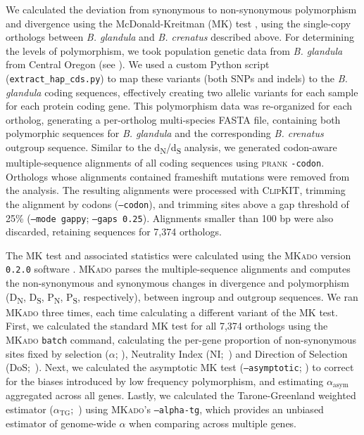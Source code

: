 \documentclass[11pt]{article}
\newcommand{\dnds}{d\textsubscript{N}/d\textsubscript{S}\xspace}
\newcommand{\bgla}{\textit{B. glandula}\xspace}
\begin{document}
We calculated the deviation from synonymous to non-synonymous polymorphism and
divergence using the McDonald-Kreitman (MK) test \citep{mcdonald_adaptive_1991},
using the single-copy orthologs between \bgla{} and \textit{B. crenatus} described
above.
For determining the levels of polymorphism, we took population genetic data from
\bgla{} from Central Oregon (see ).
We used a custom Python script (\texttt{extract\_hap\_cds.py}) to map these
variants (both SNPs and indels) to the \bgla{} coding sequences, effectively
creating two allelic variants for each sample for each protein coding gene.
This polymorphism data was re-organized for each ortholog, generating a
per-ortholog multi-species FASTA file, containing both polymorphic sequences for
\bgla{} and the corresponding \textit{B. crenatus} outgroup sequence.
Similar to the \dnds{} analysis, we generated codon-aware multiple-sequence
alignments of all coding sequences using \textsc{prank} \texttt{-codon}.
Orthologs whose alignments contained frameshift mutations were removed from the
analysis.
The resulting alignments were processed with \textsc{ClipKIT}, trimming the
alignment by codons (\texttt{--codon}), and trimming sites above a gap threshold
of 25\% (\texttt{--mode gappy}; \texttt{--gaps 0.25}).
Alignments smaller than 100 bp were also discarded, retaining sequences for 7,374 
orthologs.
\vspace{0.2cm}

The MK test and associated statistics were calculated using the \textsc{MKado}
version \texttt{0.2.0} software \citep{mkado_2026}.
\textsc{MKado} parses the multiple-sequence alignments and computes the 
non-synonymous and synonymous changes in divergence and polymorphism
(D\textsubscript{N}, D\textsubscript{S}, P\textsubscript{N}, P\textsubscript{S},
respectively), between ingroup and outgroup sequences.
We ran \textsc{MKado} three times, each time calculating a different variant of
the MK test.
First, we calculated the standard MK test \citep{mcdonald_adaptive_1991} for all
7,374 orthologs using the \textsc{MKado} \texttt{batch} command, calculating the
per-gene proportion of non-synonymous sites fixed by selection ($\alpha$;
\citealp{smith_adaptive_2002}), Neutrality Index (NI;~\citealp{rand_excess_1996})
and Direction of Selection (DoS;~\citealp{stoletzki_estimation_2011}).
Next, we calculated the asymptotic MK test (\texttt{--asymptotic};
\citealp{messer_frequent_2013}) to correct for the biases introduced by low
frequency polymorphism, and estimating $\alpha_\text{asym}$ aggregated across
all genes.
Lastly, we calculated the Tarone-Greenland weighted estimator
($\alpha_\text{TG}$;~\citealp{stoletzki_estimation_2011}) using
\textsc{MKado}'s \texttt{--alpha-tg}, which provides an unbiased estimator of
genome-wide $\alpha$ when comparing across multiple genes.
\end{document}
